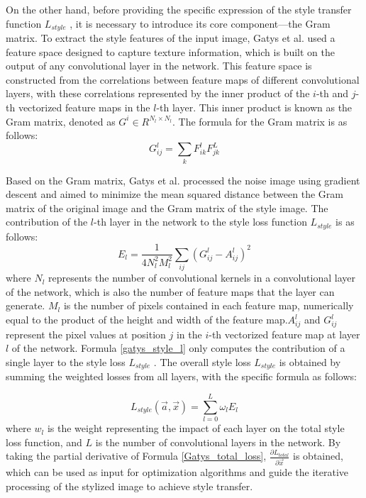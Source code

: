 \documentclass[preprint,12pt]{elsarticle}
\begin{document}
On the other hand, before providing the specific expression of the style transfer function $L_{style}$ , it is necessary to introduce its core component—the Gram matrix. To extract the style features of the input image, Gatys et al.\citep{02gatys2016image} used a feature space designed to capture texture information, which is built on the output of any convolutional layer in the network. This feature space is constructed from the correlations between feature maps of different convolutional layers, with these correlations represented by the inner product of the $i$-th and $j$-th vectorized feature maps in the $l$-th layer. This inner product is known as the Gram matrix, denoted as $G^i \in R^{N_l\times N_l}$. The formula for the Gram matrix is as follows:
\begin{equation}
    G_{ij}^l=\sum_k F_{ik}^lF_{jk}^L
\end{equation}

Based on the Gram matrix, Gatys et al.\citep{02gatys2016image} processed the noise image using gradient descent and aimed to minimize the mean squared distance between the Gram matrix of the original image and the Gram matrix of the style image. The contribution of the $l$-th layer in the network to the style loss function $L_{style}$  is as follows:
\begin{equation}
    \label{Gatys_style_loss_l}
    E_l = \frac{1}{4N_l^2M_l^2}\sum_{ij}\left(G_{ij}^l-A_{ij}^l\right)^2
\end{equation}
where $N_l$ represents the number of convolutional kernels in a convolutional layer of the network, which is also the number of feature maps that the layer can generate. $M_l$ is the number of pixels contained in each feature map, numerically equal to the product of the height and width of the feature map.$A_{ij}^l$ and $G_{ij}^l$ represent the pixel values at position $j$ in the $i$-th vectorized feature map at layer $l$ of the network. Formula \ref{gatys_style_l} only computes the contribution of a single layer to the style loss $L_{style}$ . The overall style loss $L_{style}$  is obtained by summing the weighted losses from all layers, with the specific formula as follows:

\begin{equation}
    \label{gatys_style_l}
    L_{style}\left(\vec{a},\vec{x}\right)=\sum_{l=0}^L \omega_l E_l
\end{equation}
where $w_l$ is the weight representing the impact of each layer on the total style loss function, and $L$ is the number of convolutional layers in the network. By taking the partial derivative of Formula \ref{Gatys_total_loss}, $\frac{\partial L_{total}}{\partial \vec{x}}$ is obtained, which can be used as input for optimization algorithms and guide the iterative processing of the stylized image to achieve style transfer.
\end{document}
